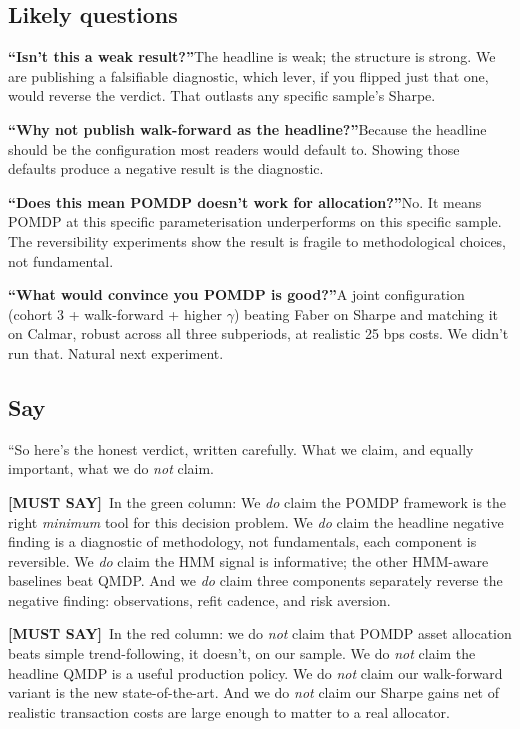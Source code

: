\documentclass[11pt]{article}
\newcommand{\mustsay}[1]{\textcolor{must}{\textbf{[MUST SAY]}}\ #1}
\begin{document}
\subsection*{Likely questions}

\textbf{``Isn't this a weak result?''}\quad The headline is weak; the structure is strong. We are publishing a falsifiable diagnostic, which lever, if you flipped just that one, would reverse the verdict. That outlasts any specific sample's Sharpe.

\textbf{``Why not publish walk-forward as the headline?''}\quad Because the headline should be the configuration most readers would default to. Showing those defaults produce a negative result is the diagnostic.

\textbf{``Does this mean POMDP doesn't work for allocation?''}\quad No. It means POMDP at this specific parameterisation underperforms on this specific sample. The reversibility experiments show the result is fragile to methodological choices, not fundamental.

\textbf{``What would convince you POMDP is good?''}\quad A joint configuration (cohort 3 + walk-forward + higher $\gamma$) beating Faber on Sharpe and matching it on Calmar, robust across all three subperiods, at realistic 25 bps costs. We didn't run that. Natural next experiment.

\subsection*{Say}

``So here's the honest verdict, written carefully. What we claim, and equally important, what we do \emph{not} claim.

\mustsay{In the green column: We \emph{do} claim the POMDP framework is the right \emph{minimum} tool for this decision problem. We \emph{do} claim the headline negative finding is a diagnostic of methodology, not fundamentals, each component is reversible. We \emph{do} claim the HMM signal is informative; the other HMM-aware baselines beat QMDP. And we \emph{do} claim three components separately reverse the negative finding: observations, refit cadence, and risk aversion.}

\mustsay{In the red column: we do \emph{not} claim that POMDP asset allocation beats simple trend-following, it doesn't, on our sample. We do \emph{not} claim the headline QMDP is a useful production policy. We do \emph{not} claim our walk-forward variant is the new state-of-the-art. And we do \emph{not} claim our Sharpe gains net of realistic transaction costs are large enough to matter to a real allocator.}
\end{document}
